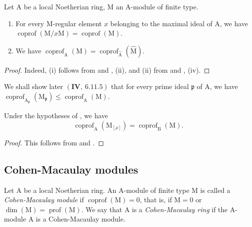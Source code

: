 \begin{proposition}[16.4.10]
\label{0.16.4.10}
Let $\mathrm{A}$ be a local Noetherian ring, $\mathrm{M}$ an $\mathrm{A}$-module of finite type.
\begin{enumerate}
  \item[\rm{(i)}] For every $\mathrm{M}$-regular element $x$ belonging to the maximal ideal of $\mathrm{A}$, we have $\operatorname{coprof}(\mathrm{M}/x\mathrm{M})=\operatorname{coprof}(\mathrm{M})$.
  \item[\rm{(ii)}] We have $\operatorname{coprof}_\mathrm{A}(\mathrm{M})=\operatorname{coprof}_{\widehat{\mathrm{A}}}(\widehat{\mathrm{M}})$.
\end{enumerate}
\end{proposition}

\begin{proof}
Indeed, (i) follows from  and , (ii), and (ii) from  and , (iv).
\end{proof}

We shall show later $(\mathbf{IV},~6.11.5)$ that for every prime ideal $\mathfrak{p}$ of $\mathrm{A}$, we have $\operatorname{coprof}_{\mathrm{A}_\mathfrak{p}}(\mathrm{M}_\mathfrak{p})\leq\operatorname{coprof}_\mathrm{A}(\mathrm{M})$.

\begin{proposition}[16.4.11]
\label{0.16.4.11}
Under the hypotheses of , we have
\begin{equation}
\label{0.16.4.11.1}
\tag{16.4.11.1}
  \operatorname{coprof}_\mathrm{A}(\mathrm{M}_{[\rho]})=\operatorname{coprof}_\mathrm{B}(\mathrm{M}).
\end{equation}
\end{proposition}

\begin{proof}
This follows from  and .
\end{proof}


\subsection{Cohen-Macaulay modules}
\label{subsection:0.16.5}

\begin{definition}[16.5.1]
\label{0.16.5.1}
Let $\mathrm{A}$ be a local Noetherian ring.
An $\mathrm{A}$-module of finite type $\mathrm{M}$ is called a \emph{Cohen-Macaulay module} if $\operatorname{coprof}(\mathrm{M})=0$, that is, if $\mathrm{M}=0$ or $\dim(\mathrm{M})=\operatorname{prof}(\mathrm{M})$.
We say that $\mathrm{A}$ is a \emph{Cohen-Macaulay ring} if the $\mathrm{A}$-module $\mathrm{A}$ is a Cohen-Macaulay module.
\end{definition}

